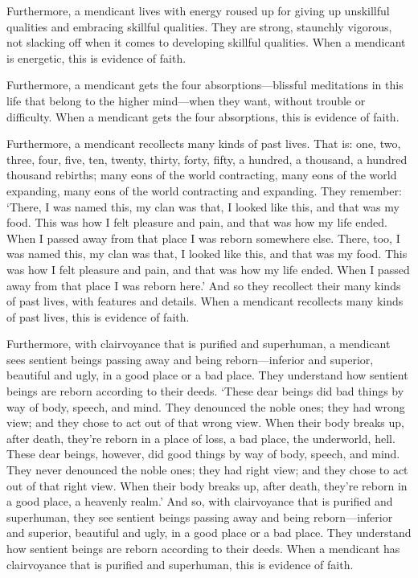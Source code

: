 \documentclass[12pt,openany]{book}%
\begin{document}
Furthermore, a mendicant lives with energy roused up for giving up unskillful qualities and embracing skillful qualities. They are strong, staunchly vigorous, not slacking off when it comes to developing skillful qualities. When a mendicant is energetic, this is evidence of faith. 

Furthermore, a mendicant gets the four absorptions—blissful meditations in this life that belong to the higher mind—when they want, without trouble or difficulty. When a mendicant gets the four absorptions, this is evidence of faith. 

Furthermore, a mendicant recollects many kinds of past lives. That is: one, two, three, four, five, ten, twenty, thirty, forty, fifty, a hundred, a thousand, a hundred thousand rebirths; many eons of the world contracting, many eons of the world expanding, many eons of the world contracting and expanding. They remember: ‘There, I was named this, my clan was that, I looked like this, and that was my food. This was how I felt pleasure and pain, and that was how my life ended. When I passed away from that place I was reborn somewhere else. There, too, I was named this, my clan was that, I looked like this, and that was my food. This was how I felt pleasure and pain, and that was how my life ended. When I passed away from that place I was reborn here.’ And so they recollect their many kinds of past lives, with features and details. When a mendicant recollects many kinds of past lives, this is evidence of faith. 

Furthermore, with clairvoyance that is purified and superhuman, a mendicant sees sentient beings passing away and being reborn—inferior and superior, beautiful and ugly, in a good place or a bad place. They understand how sentient beings are reborn according to their deeds. ‘These dear beings did bad things by way of body, speech, and mind. They denounced the noble ones; they had wrong view; and they chose to act out of that wrong view. When their body breaks up, after death, they’re reborn in a place of loss, a bad place, the underworld, hell. These dear beings, however, did good things by way of body, speech, and mind. They never denounced the noble ones; they had right view; and they chose to act out of that right view. When their body breaks up, after death, they’re reborn in a good place, a heavenly realm.’ And so, with clairvoyance that is purified and superhuman, they see sentient beings passing away and being reborn—inferior and superior, beautiful and ugly, in a good place or a bad place. They understand how sentient beings are reborn according to their deeds. When a mendicant has clairvoyance that is purified and superhuman, this is evidence of faith. 
\end{document}
